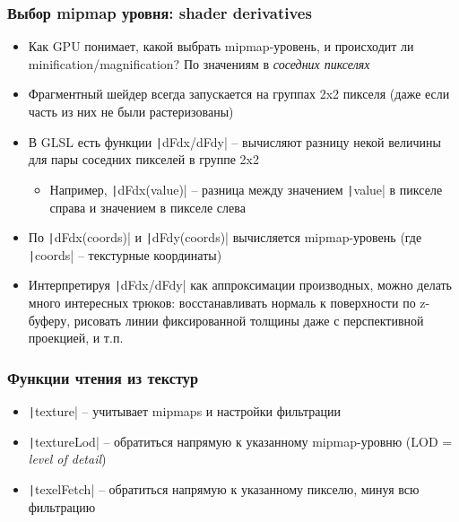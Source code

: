 \documentclass[10pt]{beamer}
\begin{document}
\begin{frame}[fragile]
\frametitle{Выбор mipmap уровня: shader derivatives}
\begin{itemize}
\item Как GPU понимает, какой выбрать mipmap-уровень, и происходит ли minification/magnification? \pause По значениям в \textit{соседних пикселях}
\pause
\item Фрагментный шейдер всегда запускается на группах 2x2 пикселя (даже если часть из них не были растеризованы)
\pause
\item В GLSL есть функции \texttt|dFdx/dFdy| -- вычисляют разницу некой величины для пары соседних пикселей в группе 2x2
\pause
\begin{itemize}
\item Например, \texttt|dFdx(value)| -- разница между значением \texttt|value| в пикселе справа и значением в пикселе слева
\end{itemize}
\pause
\item По \texttt|dFdx(coords)| и \texttt|dFdy(coords)| вычисляется mipmap-уровень (где \texttt|coords| -- текстурные координаты)
\pause
\item Интерпретируя \texttt|dFdx/dFdy| как аппроксимации производных, можно делать много интересных трюков: восстанавливать нормаль к поверхности по z-буферу, рисовать линии фиксированной толщины даже с перспективной проекцией, и т.п.
\end{itemize}
\end{frame}

\begin{frame}[fragile]
\frametitle{Функции чтения из текстур}
\begin{itemize}
\item \texttt|texture| -- учитывает mipmaps и настройки фильтрации
\pause
\item \texttt|textureLod| -- обратиться напрямую к указанному mipmap-уровню (LOD = \textit{level of detail})
\pause
\item \texttt|texelFetch| -- обратиться напрямую к указанному пикселю, минуя всю фильтрацию
\end{itemize}
\end{frame}
\end{document}
